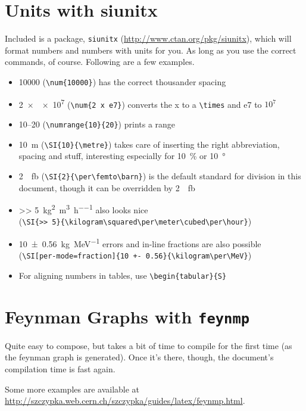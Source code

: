 \section{Units with siunitx} %
\label{sec:units_with_siunitx}
Included is a package, \texttt{siunitx} (\url{http://www.ctan.org/pkg/siunitx}), which will format numbers and numbers with units for you. As long as you use the correct commands, of course. Following are a few examples.
\begin{itemize}
	\item \num{10000} (\verb|\num{10000}|) has the correct thousander spacing
	\item \num{2 x e7} (\verb|\num{2 x e7}|) converts the x to a \verb|\times| and e7 to $10^7$
	\item \numrange{10}{20} (\verb|\numrange{10}{20}|) prints a range
	\item \SI{10}{\metre} (\verb|\SI{10}{\metre}|) takes care of inserting the right abbreviation, spacing and stuff, interesting especially for \SI{10}{\percent} or \SI{10}{\degree}
	\item \SI{2}{\per\femto\barn} (\verb|\SI{2}{\per\femto\barn}|) is the default standard for division in this document, though it can be overridden by \SI[per-mode=reciprocal]{2}{\per\femto\barn}
	\item \SI{>> 5}{\kilogram\squared\per\meter\cubed\per\hour} also looks nice \\
	(\verb|\SI{>> 5}{\kilogram\squared\per\meter\cubed\per\hour}|)
	\item \SI[per-mode=fraction]{10 +- 0.56}{\kilogram\per\MeV} errors and in-line fractions are also possible\\
	(\verb|\SI[per-mode=fraction]{10 +- 0.56}{\kilogram\per\MeV}|)
	\item For aligning numbers in tables, use \verb|\begin{tabular}{S}|
\end{itemize}

\section{Feynman Graphs with \texttt{feynmp}} %
\label{sec:feynman_graphs_with_feynmp}
Quite easy to compose, but takes a bit of time to compile for the first time (as the feynman graph is generated). Once it's there, though, the document's compilation time is fast again.

Some more examples are available at\newline
\url{http://szczypka.web.cern.ch/szczypka/guides/latex/feynmp.html}.

